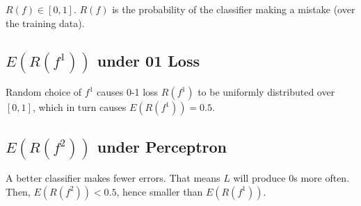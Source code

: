\documentclass[11pt]{scrartcl}
\begin{document}
$R(f) \in [0, 1]$. $R(f)$ is the probability of the classifier making a mistake (over the training data).

\subsection{$E(R(f^1))$ under 01 Loss}

Random choice of $f^1$ causes 0-1 loss $R(f^1)$ to be uniformly distributed over $[0,1]$, which in turn causes $E(R(f^1)) = 0.5$.

\subsection{$E(R(f^2))$ under Perceptron}

A better classifier makes fewer errors. That means $L$ will produce 0s more often. Then, $E(R(f^2)) < 0.5$, hence smaller than $E(R(f^1))$.
\end{document}
